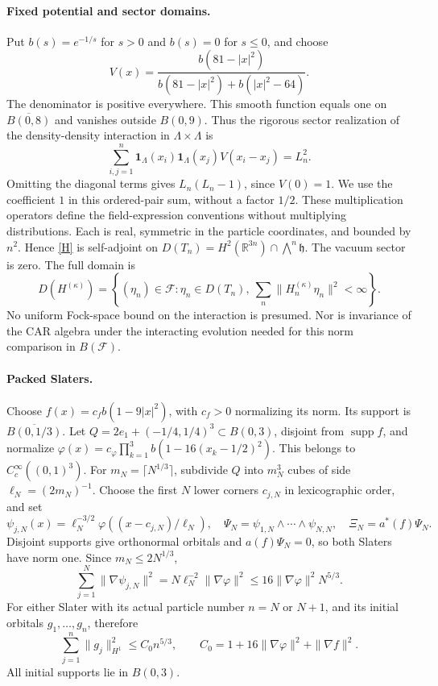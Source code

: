 \documentclass[11pt]{article}
\newcommand{\F}{\mathcal F}
\newcommand{\supp}{\operatorname{supp}}
\newcommand{\id}{\mathbf 1}
\begin{document}
\paragraph{Fixed potential and sector domains.}
Put $b(s)=e^{-1/s}$ for $s>0$ and $b(s)=0$ for $s\leq0$, and choose
\begin{equation}\label{V}
 V(x)=\frac{b(81-|x|^2)}{b(81-|x|^2)+b(|x|^2-64)} .
\end{equation}
The denominator is positive everywhere. This smooth function equals one on
$\overline{B(0,8)}$ and vanishes outside $B(0,9)$. Thus the rigorous
sector realization of the density-density interaction in $\Lambda\times\Lambda$
is
\[
 \sum_{i,j=1}^n\id_\Lambda(x_i)\id_\Lambda(x_j)V(x_i-x_j)=L_n^2.
\]
Omitting the diagonal terms gives $L_n(L_n-1)$, since $V(0)=1$.
We use the coefficient $1$ in this ordered-pair sum, without a factor $1/2$.
These multiplication operators define the field-expression conventions
without multiplying distributions. Each is real, symmetric in the particle
coordinates, and bounded by $n^2$. Hence \eqref{H} is self-adjoint on
$D(T_n)=H^2(\mathbb R^{3n})\cap\bigwedge^n\mathfrak h$. The vacuum sector
is zero. The full domain is
\[
 D(H^{(\kappa)})=\left\{(\eta_n)\in\F:
 \eta_n\in D(T_n),\ \sum_n\|H_n^{(\kappa)}\eta_n\|^2<\infty\right\}.
\]
No uniform Fock-space bound on the interaction is presumed. Nor is invariance
of the CAR algebra under the interacting evolution needed for this norm
comparison in $B(\F)$.

\paragraph{Packed Slaters.}
Choose $f(x)=c_f b(1-9|x|^2)$, with $c_f>0$ normalizing its norm.
Its support is $\overline{B(0,1/3)}$. Let
$Q=2e_1+(-1/4,1/4)^3\subset B(0,3)$, disjoint from $\supp f$, and
normalize
$\varphi(x)=c_\varphi\prod_{k=1}^3 b(1-16(x_k-1/2)^2)$.
This belongs to $C_c^\infty((0,1)^3)$. For $m_N=\lceil N^{1/3}\rceil$,
subdivide $Q$ into $m_N^3$ cubes of side $\ell_N=(2m_N)^{-1}$.
Choose the first $N$ lower corners $c_{j,N}$ in lexicographic order, and set
\[
 \psi_{j,N}(x)=\ell_N^{-3/2}\varphi((x-c_{j,N})/\ell_N),\quad
 \Psi_N=\psi_{1,N}\wedge\cdots\wedge\psi_{N,N},\quad
 \Xi_N=a^*(f)\Psi_N .
\]
Disjoint supports give orthonormal orbitals and $a(f)\Psi_N=0$, so both
Slaters have norm one. Since $m_N\leq2N^{1/3}$,
\[
 \sum_{j=1}^N\|\nabla\psi_{j,N}\|^2
 =N\ell_N^{-2}\|\nabla\varphi\|^2
 \leq16\|\nabla\varphi\|^2N^{5/3}.
\]
For either Slater with its actual particle number $n=N$ or $N+1$, and its
initial orbitals $g_1,\ldots,g_n$, therefore
\begin{equation}\label{energy}
 \sum_{j=1}^n\|g_j\|_{H^1}^2\leq C_0 n^{5/3},\qquad
 C_0=1+16\|\nabla\varphi\|^2+\|\nabla f\|^2 .
\end{equation}
All initial supports lie in $B(0,3)$.
\end{document}
